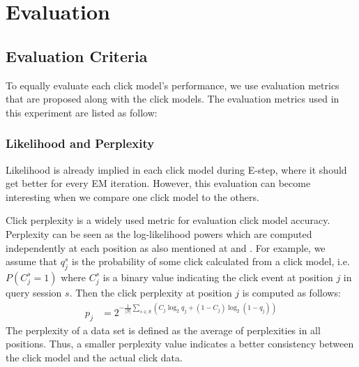 \section{Evaluation}
\label{sec:evaluation}

\subsection{Evaluation Criteria}
To equally evaluate each click model's performance, we use evaluation metrics that are proposed along with the click models. The evaluation metrics used in this experiment are listed as follow:

\subsubsection{Likelihood and Perplexity}
Likelihood is already implied in each click model during E-step, where it should get better for every EM iteration. 
However, this evaluation can become interesting when we compare one click model to the others.

Click perplexity is a widely used metric for evaluation click model accuracy.
Perplexity can be seen as the log-likelihood powers which are computed independently at each position as also mentioned at \cite{Zhang2011} and \cite{Dupret2008}. 
For example, we assume that $q_j^s$ is the probability of some click calculated from a click model, i.e. $P(C_j^s=1)$ where $C_j^s$ is a binary value indicating the click event at position $j$ in query session $s$. Then the click perplexity at position $j$ is computed as follows:
\begin{align*}
	p_j 
	&= 2^{-\frac{1}{|S|} \sum_{s \in S}(C_j \log_2 q_j + (1-C_j) \log_2 (1-q_j))}
\end{align*}
The perplexity of a data set is defined as the average of perplexities in all positions.
Thus, a smaller perplexity value indicates a better consistency between the click model and the actual click data.

